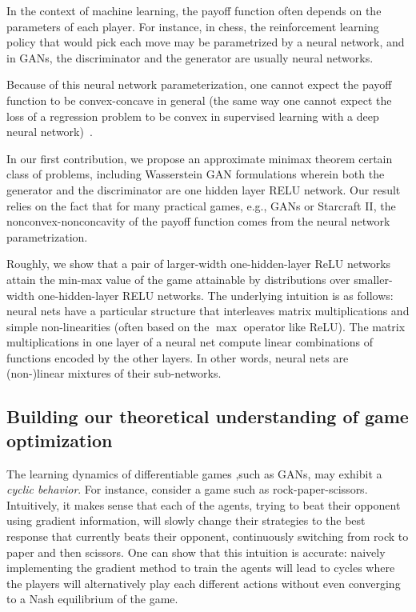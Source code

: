 In the context of machine learning, the payoff function often depends on the parameters of each player. For instance, in chess, the reinforcement learning policy that would pick each move may be parametrized by a neural network, and in GANs, the discriminator and the generator are usually neural networks. 

Because of this neural network parameterization, one cannot expect the payoff function to be convex-concave in general (the same way one cannot expect the loss of a regression problem to be convex in supervised learning with a deep neural network)~\citep{choromanska2015loss}.

In our first contribution, we propose an approximate minimax theorem certain class of problems, including Wasserstein GAN formulations wherein both the generator and the discriminator are one hidden layer RELU network. Our result relies on the fact that for many practical games, e.g., GANs or Starcraft II, the nonconvex-nonconcavity of the payoff function comes from the neural network parametrization. 

Roughly, we show that a pair of larger-width one-hidden-layer ReLU networks attain the min-max value of the game attainable by distributions over smaller-width one-hidden-layer RELU networks. The underlying intuition is as follows: neural nets have a particular structure that interleaves matrix multiplications and simple non-linearities (often based on the $\max$ operator like ReLU). The matrix multiplications in one layer of a neural net compute linear combinations of functions encoded by the other layers. In other words, neural nets are (non-)linear mixtures of their sub-networks. 

\subsection{Building our theoretical understanding of game optimization}

The learning dynamics of differentiable games ,such as GANs, may exhibit a \emph{cyclic behavior}. For instance, consider a game such as rock-paper-scissors. Intuitively, it makes sense that each of the agents, trying to beat their opponent using gradient information, will slowly change their strategies to the best response that currently beats their opponent, continuously switching from rock to paper and then scissors. One can show that this intuition is accurate: naively implementing the gradient method to train the agents will lead to cycles where the players will alternatively play each different actions without even converging to a Nash equilibrium of the game. 

